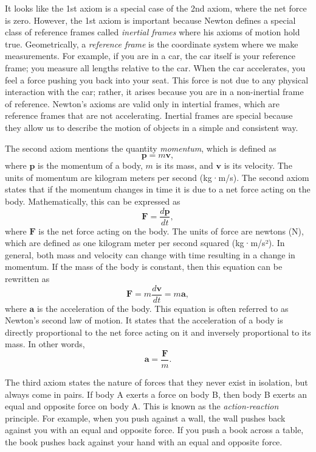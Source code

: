 \documentclass[../main.tex]{subfiles}
\begin{document}
It looks like the 1st axiom is a special case of the 2nd axiom, where the net force is zero. However, the 1st axiom is important because Newton defines a special class of reference frames called \emph{inertial frames} where his axioms of motion hold true. Geometrically, a \emph{reference frame} is the coordinate system where we make measurements. For example, if you are in a car, the car itself is your reference frame; you measure all lengths relative to the car. When the car accelerates, you feel a force pushing you back into your seat. This force is not due to any physical interaction with the car; rather, it arises because you are in a non-inertial frame of reference. Newton's axioms are valid only in intertial frames, which are reference frames that are not accelerating. Inertial frames are special because they allow us to describe the motion of objects in a simple and consistent way.

The second axiom mentions the quantity \emph{momentum}, which is defined as
\begin{equation}
    \mathbf{p} = m\mathbf{v},
\end{equation}
where $\mathbf{p}$ is the momentum of a body, $m$ is its mass, and $\mathbf{v}$ is its velocity. The units of momentum are kilogram meters per second (kg·m/s). The second axiom states that if the momentum changes in time it is due to a net force acting on the body. Mathematically, this can be expressed as
\begin{equation}
    \mathbf{F} = \frac{d\mathbf{p}}{dt},
\end{equation}
where $\mathbf{F}$ is the net force acting on the body. The units of force are newtons (N), which are defined as one kilogram meter per second squared (kg·m/s²). In general, both mass and velocity can change with time resulting in a change in momentum. If the mass of the body is constant, then this equation can be rewritten as
\begin{equation}
    \mathbf{F} = m\frac{d\mathbf{v}}{dt} = m\mathbf{a},
\end{equation}
where $\mathbf{a}$ is the acceleration of the body. This equation is often referred to as Newton's second law of motion. It states that the acceleration of a body is directly proportional to the net force acting on it and inversely proportional to its mass. In other words,
\begin{equation}
    \mathbf{a} = \frac{\mathbf{F}}{m}.
\end{equation}

The third axiom states the nature of forces that they never exist in isolation, but always come in pairs. If body A exerts a force on body B, then body B exerts an equal and opposite force on body A. This is known as the \emph{action-reaction} principle. For example, when you push against a wall, the wall pushes back against you with an equal and opposite force. If you push a book across a table, the book pushes back against your hand with an equal and opposite force.
\end{document}
